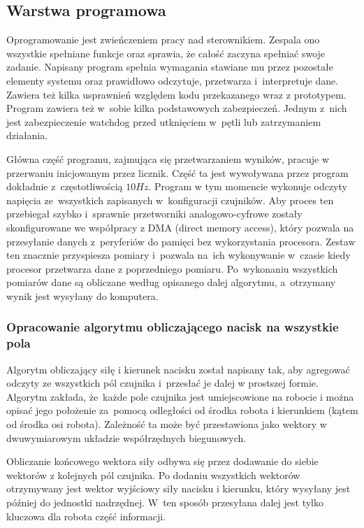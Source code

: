 \subsection{Warstwa programowa}
\label{ss_budowa_prog}

Oprogramowanie jest zwieńczeniem pracy nad sterownikiem. Zespala ono wszystkie spełniane funkcje oraz sprawia, że całość zaczyna spełniać swoje zadanie. Napisany program spełnia wymagania stawiane mu przez pozostałe elementy systemu oraz prawidłowo odczytuje, przetwarza i~interpretuje dane. Zawiera też kilka usprawnień względem kodu przekazanego wraz z prototypem. Program zawiera też w~sobie kilka podstawowych zabezpieczeń. Jednym z~nich jest zabezpieczenie watchdog przed utknięciem w~pętli lub zatrzymaniem działania. 

Główna część programu, zajmująca się przetwarzaniem wyników, pracuje w przerwaniu inicjowanym przez licznik. Część ta jest wywoływana przez program dokładnie z~częstotliwością $10 Hz$. Program w tym momencie wykonuje odczyty napięcia ze~wszystkich zapisanych w~konfiguracji czujników. Aby proces ten przebiegał szybko i~sprawnie przetworniki analogowo-cyfrowe zostały skonfigurowane we współpracy z DMA (direct memory access), który pozwala na przesyłanie danych z~peryferiów do pamięci bez wykorzystania procesora. Zestaw ten znacznie przyspiesza pomiary i~pozwala na~ich wykonywanie w~czasie kiedy procesor przetwarza dane z poprzedniego pomiaru. Po~wykonaniu wszystkich pomiarów dane są obliczane według opisanego dalej algorytmu, a~otrzymany wynik jest wysyłany do komputera.


\subsubsection{Opracowanie algorytmu obliczającego nacisk na wszystkie pola}
\label{sss_budowa_opracowanie_algorytmu}

Algorytm obliczający siłę i kierunek nacisku został napisany tak, aby agregować odczyty ze wszystkich pól czujnika i~przesłać je dalej w prostszej formie. Algorytm zakłada, że~każde pole czujnika jest umiejscowione na robocie i można opisać jego położenie za~pomocą odległości od środka robota i kierunkiem (kątem od środka osi robota). Zależność ta może być przestawiona jako wektory w dwuwymiarowym układzie współrzędnych biegunowych.

Obliczanie końcowego wektora siły odbywa się przez dodawanie do siebie wektorów z kolejnych pól czujnika. Po dodaniu wszystkich wektorów otrzymywany jest wektor wyjściowy siły nacisku i kierunku, który wysyłany jest później do jednostki nadrzędnej. W~ten sposób przesyłana dalej jest tylko kluczowa dla robota część informacji.

